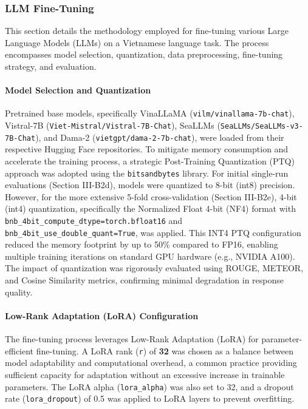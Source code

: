 \documentclass[conference]{IEEEtran}
\begin{document}
\subsubsection{LLM Fine-Tuning}
\label{sec:LLM Fine-Tuning}

This section details the methodology employed for fine-tuning various Large Language Models (LLMs) on a Vietnamese language task. The process encompasses model selection, quantization, data preprocessing, fine-tuning strategy, and evaluation.

\paragraph{Model Selection and Quantization}
Pretrained base models, specifically VinaLLaMA (\texttt{vilm/vinallama-7b-chat}), Vistral-7B (\texttt{Viet-Mistral/Vistral-7B-Chat}), SeaLLMs (\texttt{SeaLLMs/SeaLLMs-v3-7B-Chat}), and Dama-2 (\texttt{vietgpt/dama-2-7b-chat}), were loaded from their respective Hugging Face repositories. To mitigate memory consumption and accelerate the training process, a strategic Post-Training Quantization (PTQ) approach was adopted using the \texttt{bitsandbytes} library. For initial single-run evaluations (Section III-B2d), models were quantized to 8-bit (int8) precision. However, for the more extensive 5-fold cross-validation (Section III-B2e), 4-bit (int4) quantization, specifically the Normalized Float 4-bit (NF4) format with \texttt{bnb\_4bit\_compute\_dtype=torch.bfloat16} and \texttt{bnb\_4bit\_use\_double\_quant=True}, was applied. This INT4 PTQ configuration reduced the memory footprint by up to 50\% compared to FP16, enabling multiple training iterations on standard GPU hardware (e.g., NVIDIA A100). The impact of quantization was rigorously evaluated using ROUGE, METEOR, and Cosine Similarity metrics, confirming minimal degradation in response quality.
\paragraph{Low-Rank Adaptation (LoRA) Configuration}
The fine-tuning process leverages Low-Rank Adaptation (LoRA) \cite{b7} for parameter-efficient fine-tuning. A LoRA rank (\texttt{r}) of \textbf{32} was chosen as a balance between model adaptability and computational overhead, a common practice providing sufficient capacity for adaptation without an excessive increase in trainable parameters. The LoRA alpha (\texttt{lora\_alpha}) was also set to 32, and a dropout rate (\texttt{lora\_dropout}) of 0.5 was applied to LoRA layers to prevent overfitting.
\end{document}
